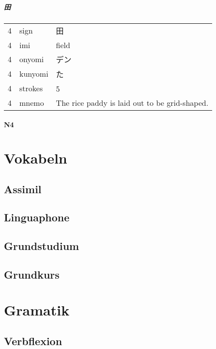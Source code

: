 \documentclass[justified, a4paper, notitlepage, captions=tableheading, nobib]{tufte-handout}
\begin{document}
\subparagraph{田}
\label{sec:org6464f67}

\label{tab:org7636da4}
\begin{tabular}{rll}
4 & sign & 田\\
4 & imi & field\\
4 & onyomi & デン\\
4 & kunyomi & た\\
4 & strokes & 5　\\
4 & mnemo & The rice paddy is laid out to be grid-shaped.\\
\end{tabular}

\paragraph{N4}
\label{sec:orgd1cbb04}

\section{Vokabeln }
\label{sec:org35ca1bf}

\subsection{Assimil}
\label{sec:orgf79a7af}

\subsection{Linguaphone}
\label{sec:org3b0e20c}

\subsection{Grundstudium}
\label{sec:org144747c}

\subsection{Grundkurs}
\label{sec:org1d6ce29}

\section{Gramatik }
\label{sec:orgacd30de}

\subsection{Verbflexion }
\label{sec:org64e7793}
\end{document}
